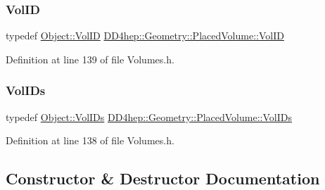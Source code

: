 \hypertarget{class_d_d4hep_1_1_geometry_1_1_placed_volume_aaecde4f8feb863af7cd36c1213bfabe4}{}\label{class_d_d4hep_1_1_geometry_1_1_placed_volume_aaecde4f8feb863af7cd36c1213bfabe4} 
\subsubsection{\texorpdfstring{Vol\+ID}{VolID}}
{\footnotesize\ttfamily typedef \hyperlink{class_d_d4hep_1_1_geometry_1_1_placed_volume_extension_a9f0e95dedfbda206b118af985b2ed473}{Object\+::\+Vol\+ID} \hyperlink{class_d_d4hep_1_1_geometry_1_1_placed_volume_aaecde4f8feb863af7cd36c1213bfabe4}{D\+D4hep\+::\+Geometry\+::\+Placed\+Volume\+::\+Vol\+ID}}



Definition at line 139 of file Volumes.\+h.

\hypertarget{class_d_d4hep_1_1_geometry_1_1_placed_volume_a4383991fbc94adc2997ef98c9d30d9a6}{}\label{class_d_d4hep_1_1_geometry_1_1_placed_volume_a4383991fbc94adc2997ef98c9d30d9a6} 
\subsubsection{\texorpdfstring{Vol\+I\+Ds}{VolIDs}}
{\footnotesize\ttfamily typedef \hyperlink{class_d_d4hep_1_1_geometry_1_1_placed_volume_extension_1_1_vol_i_ds}{Object\+::\+Vol\+I\+Ds} \hyperlink{class_d_d4hep_1_1_geometry_1_1_placed_volume_a4383991fbc94adc2997ef98c9d30d9a6}{D\+D4hep\+::\+Geometry\+::\+Placed\+Volume\+::\+Vol\+I\+Ds}}



Definition at line 138 of file Volumes.\+h.



\subsection{Constructor \& Destructor Documentation}
\hypertarget{class_d_d4hep_1_1_geometry_1_1_placed_volume_ad5ba4a479af1d8ae77357d34bb91fe00}{}\label{class_d_d4hep_1_1_geometry_1_1_placed_volume_ad5ba4a479af1d8ae77357d34bb91fe00} 
